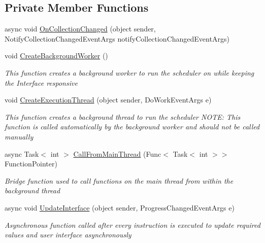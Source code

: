 \subsection*{Private Member Functions}
\begin{DoxyCompactItemize}
\item 
async void \hyperlink{class_c_p_u___o_s___simulator_1_1_operating___system_1_1_scheduler_adad5f14e290b9b67f727cd24b4f09158}{On\+Collection\+Changed} (object sender, Notify\+Collection\+Changed\+Event\+Args notify\+Collection\+Changed\+Event\+Args)
\item 
void \hyperlink{class_c_p_u___o_s___simulator_1_1_operating___system_1_1_scheduler_a5de68bce87efcb0d511d7e5a9bd4fe1f}{Create\+Background\+Worker} ()
\begin{DoxyCompactList}\small\item\em This function creates a background worker to run the scheduler on while keeping the Interface responsive \end{DoxyCompactList}\item 
void \hyperlink{class_c_p_u___o_s___simulator_1_1_operating___system_1_1_scheduler_a6b7d6ca2dc12aa2290263cc94aab7779}{Create\+Execution\+Thread} (object sender, Do\+Work\+Event\+Args e)
\begin{DoxyCompactList}\small\item\em This function creates a background thread to run the scheduler N\+O\+T\+E\+: This function is called automatically by the background worker and should not be called manually \end{DoxyCompactList}\item 
async Task$<$ int $>$ \hyperlink{class_c_p_u___o_s___simulator_1_1_operating___system_1_1_scheduler_a6b162741d7ccadc56da0e5a1b545efda}{Call\+From\+Main\+Thread} (Func$<$ Task$<$ int $>$$>$ Function\+Pointer)
\begin{DoxyCompactList}\small\item\em Bridge function used to call functions on the main thread from within the background thread \end{DoxyCompactList}\item 
async void \hyperlink{class_c_p_u___o_s___simulator_1_1_operating___system_1_1_scheduler_ac34fa53a93283545f0049794306e30a1}{Update\+Interface} (object sender, Progress\+Changed\+Event\+Args e)
\begin{DoxyCompactList}\small\item\em Asynchronous function called after every instruction is executed to update required values and user interface asynchronously \end{DoxyCompactList}\item 
$$
\end{DoxyCompactItemize}
